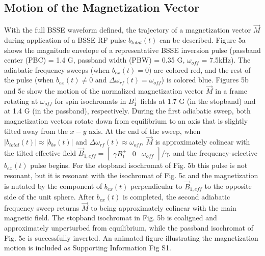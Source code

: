 \documentclass{article}
\newcommand{\bfullt}{b_{total}(t)}
\newcommand{\bext}{b_{ex}(t)}
\newcommand{\bbst}{b_{bs}(t)}
\begin{document}
\subsection{Motion of the Magnetization Vector}
With the full BSSE waveform defined, 
the trajectory of a magnetization vector $\overrightarrow{M}$ 
during application of a BSSE RF pulse $\bfullt$ can be described. 
Figure 5a shows the magnitude envelope of a representative BSSE inversion pulse (passband center (PBC) = 1.4 G, passband width (PBW) = 0.35 G, $\omega_{off}$ = 7.5kHz). 
The adiabatic frequency sweeps (when $\bext = 0)$ are colored red, 
and the rest of the pulse (when $\bext \neq 0$ and $\Delta \omega_{rf}(t) = \omega_{off}$) is colored blue. 
Figures 5b and 5c show the motion of the normalized magnetization vector $\overrightarrow{M}$ in a frame rotating at $\omega_{off}$ for spin isochromats in $B_1^+$ fields at 1.7 G (in the stopband) and at 1.4 G (in the passband), respectively. 
During the first adiabatic sweep, both magnetization vectors rotate down from equilibrium
to an axis that is slightly tilted away from the $x-y$ axis.
At the end of the sweep, when $|\bfullt| \approx |\bbst|$ and $\Delta \omega_{rf}(t) \approx \omega_{off}$, 
$\overrightarrow{M}$ is approximately colinear with the tilted effective field $\overrightarrow{B}_{1,eff} = \left[\begin{array}{ccc} \gamma B_1^+ & 0 & \omega_{off}\end{array}\right]/\gamma$,
and the frequency-selective $\bext$ pulse begins. 
For the stopband isochromat of Fig. 5b this pulse is not resonant, 
but it is resonant with the isochromat of Fig. 5c 
and the magnetization is nutated by the component of $\bext$ perpendicular to $\overrightarrow{B}_{1,eff}$ 
to the opposite side of the unit sphere.
After $\bext$ is completed, the second adiabatic frequency sweep returns $\overrightarrow{M}$ to being approximately colinear with the main magnetic field. 
The stopband isochromat in Fig. 5b is coaligned and approximately unperturbed from equilibrium, 
while the passband isochromat of Fig. 5c  is successfully inverted.
An animated figure illustrating the magnetization motion is included as Supporting Information Fig S1.
\end{document}
